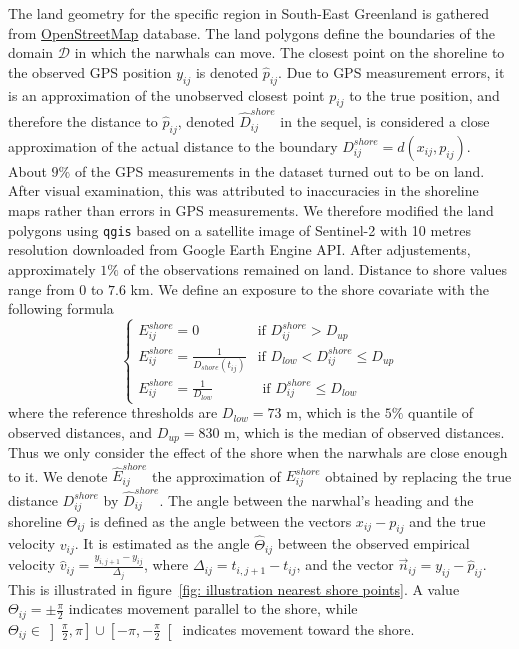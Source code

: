 \documentclass[11pt]{article}
\newcommand {\1}{\mathbb{1}}
\theoremstyle{definition}
\theoremstyle{remark}
\theoremstyle{remark}
\begin{document}
The land geometry for the specific region in South-East Greenland is gathered from \href{https://www.openstreetmap.org/#map=11/70.4029/-27.2928}{OpenStreetMap} database. The land polygons define the boundaries of the domain $\mathcal{D}$ in which the narwhals can move. The closest point on the shoreline to the observed GPS position $y_{ij}$  is denoted $\hat{p}_{ij}$. Due to GPS measurement errors, it is an approximation of the unobserved closest point $p_{ij}$ to the true position, and therefore the distance to $\hat{p}_{ij}$, denoted $\hat{D}^{shore}_{ij}$ in the sequel, is considered a close approximation of the actual distance to the boundary $D^{shore}_{ij}=d(x_{ij},p_{ij})$. About $9\%$ of the GPS measurements in the dataset turned out to be on land. After visual examination, this was attributed to inaccuracies in the shoreline maps rather than errors in GPS measurements. We therefore modified the land polygons using \texttt{qgis} based on a satellite image of Sentinel-2 with 10 metres resolution downloaded from Google Earth Engine API. After adjustements,  approximately $1 \%$ of the observations remained on land. Distance to shore values range from $0$ to $7.6$ km. We define an exposure to the shore covariate with the following formula
\begin{equation}
	\left\{
	\begin{array}{ll}
		E^{shore}_{ij}=0 & \mbox{if } D^{shore}_{ij}>D_{up} \\
		E^{shore}_{ij}=\frac{1}{D_{shore}(t_{ij})} & \mbox{if } D_{low}<D^{shore}_{ij} \leq D_{up} \\
		E^{shore}_{ij}=\frac{1}{D_{low}} & \mbox{ if } D^{shore}_{ij} \leq D_{low}
	\end{array}
	\right.
	\label{eq: exp shore definition}
\end{equation}
where the reference thresholds are $D_{low}=73$ m, which is the $5\%$ quantile of observed distances, and $D_{up}=830$ m, which is the median of observed distances. Thus we only consider the effect of the shore when the narwhals are close enough to it. We denote $\hat{E}^{shore}_{ij}$ the approximation of $E^{shore}_{ij}$ obtained by replacing the true distance $D^{shore}_{ij}$ by $\hat{D}^{shore}_{ij}$.
The angle between the narwhal's heading and the shoreline $\Theta_{ij}$ is defined as the angle between the vectors $x_{ij}-p_{ij}$ and the true velocity $v_{ij}$. It is estimated as the angle $\hat{\Theta}_{ij}$ between the observed empirical velocity $\hat{v}_{ij}=\frac{y_{i,j+1}-y_{ij}}{\Delta_j}$, where $\Delta_{ij}=t_{i,j+1}-t_{ij}$, and the vector $\vec{n}_{ij}=y_{ij}-\hat{p}_{ij}$. This is illustrated in figure~\ref{fig: illustration nearest shore points}. A value $\Theta_{ij}=\pm \frac{\pi}{2}$ indicates movement parallel to the shore, while $\Theta_{ij} \in \left]\frac{\pi}{2},\pi\right] \cup \left[-\pi,-\frac{\pi}{2}\right[$ indicates movement toward the shore. 
\end{document}
